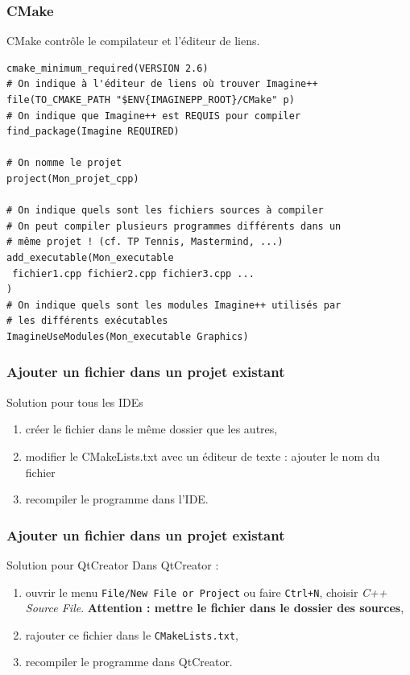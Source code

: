 \begin{frame}[fragile]
\frametitle{CMake}
CMake contrôle le compilateur et l'éditeur de liens.

\begin{verbatim}
cmake_minimum_required(VERSION 2.6)
# On indique à l'éditeur de liens où trouver Imagine++
file(TO_CMAKE_PATH "$ENV{IMAGINEPP_ROOT}/CMake" p)
# On indique que Imagine++ est REQUIS pour compiler
find_package(Imagine REQUIRED)

# On nomme le projet
project(Mon_projet_cpp)

# On indique quels sont les fichiers sources à compiler
# On peut compiler plusieurs programmes différents dans un
# même projet ! (cf. TP Tennis, Mastermind, ...)
add_executable(Mon_executable
 fichier1.cpp fichier2.cpp fichier3.cpp ...
)
# On indique quels sont les modules Imagine++ utilisés par
# les différents exécutables
ImagineUseModules(Mon_executable Graphics)
\end{verbatim}

\end{frame}


\begin{frame}
    \frametitle{Ajouter un fichier dans un projet existant}
    
    \begin{block}{Solution pour tous les IDEs}
        \begin{enumerate}
            \item créer le fichier dans le même dossier que les autres,
            \item modifier le CMakeLists.txt avec un éditeur de texte :
            ajouter le nom du fichier
            \item recompiler le programme dans l'IDE.
        \end{enumerate}
    \end{block}
    
\end{frame}

\begin{frame}
    \frametitle{Ajouter un fichier dans un projet existant}
    
    \begin{block}{Solution pour QtCreator}
        Dans QtCreator :
        \begin{enumerate}
        \item ouvrir le menu \texttt{File/New File or Project} ou faire \texttt{Ctrl+N}, choisir \textit{C++ Source File}. \textbf{Attention : mettre le fichier dans le dossier des sources},
        \item rajouter ce fichier dans le \texttt{CMakeLists.txt},
        \item recompiler le programme dans QtCreator.
        \end{enumerate}
    \end{block}
    
\end{frame}

